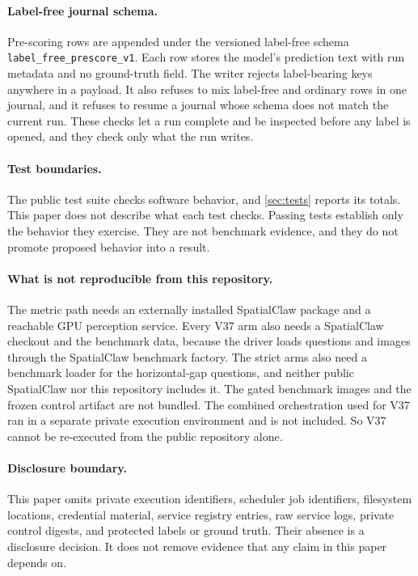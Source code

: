 \documentclass{article}
\begin{document}
\paragraph{Label-free journal schema.}
Pre-scoring rows are appended under the versioned label-free schema \texttt{label\_free\_prescore\_v1}. Each row stores the model's prediction text with run metadata and no ground-truth field. The writer rejects label-bearing keys anywhere in a payload. It also refuses to mix label-free and ordinary rows in one journal, and it refuses to resume a journal whose schema does not match the current run. These checks let a run complete and be inspected before any label is opened, and they check only what the run writes.

\paragraph{Test boundaries.}
The public test suite checks software behavior, and \cref{sec:tests} reports its totals. This paper does not describe what each test checks. Passing tests establish only the behavior they exercise. They are not benchmark evidence, and they do not promote proposed behavior into a result.

\paragraph{What is not reproducible from this repository.}
The metric path needs an externally installed SpatialClaw package and a reachable GPU perception service. Every V37 arm also needs a SpatialClaw checkout and the benchmark data, because the driver loads questions and images through the SpatialClaw benchmark factory. The strict arms also need a benchmark loader for the horizontal-gap questions, and neither public SpatialClaw nor this repository includes it. The gated benchmark images and the frozen control artifact are not bundled. The combined orchestration used for V37 ran in a separate private execution environment and is not included. So V37 cannot be re-executed from the public repository alone.

\paragraph{Disclosure boundary.}
This paper omits private execution identifiers, scheduler job identifiers, filesystem locations, credential material, service registry entries, raw service logs, private control digests, and protected labels or ground truth. Their absence is a disclosure decision. It does not remove evidence that any claim in this paper depends on.
\end{document}
